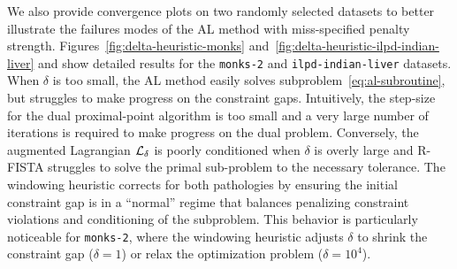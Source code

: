 We also provide convergence plots on two randomly selected datasets to better illustrate the failures modes of the AL method with miss-specified penalty strength.
Figures~\ref{fig:delta-heuristic-monks} and~\ref{fig:delta-heuristic-ilpd-indian-liver} and show detailed results for the \texttt{monks-2} and \texttt{ilpd-indian-liver} datasets.
When \( \delta \) is too small, the AL method easily solves subproblem~\eqref{eq:al-subroutine}, but struggles to make progress on the constraint gaps.
Intuitively, the step-size for the dual proximal-point algorithm is too small and a very large number of iterations is required to make progress on the dual problem.
Conversely, the augmented Lagrangian \( \mathcal{L}_\delta \) is poorly conditioned when \( \delta \) is overly large and R-FISTA struggles to solve the primal sub-problem to the necessary tolerance.
The windowing heuristic corrects for both pathologies by ensuring the initial constraint gap is in a ``normal'' regime that balances penalizing constraint violations and conditioning of the subproblem.
This behavior is particularly noticeable for \texttt{monks-2}, where the windowing heuristic adjusts \( \delta \) to shrink the constraint gap (\( \delta = 1 \)) or relax the optimization problem (\( \delta = 10^4 \)).
